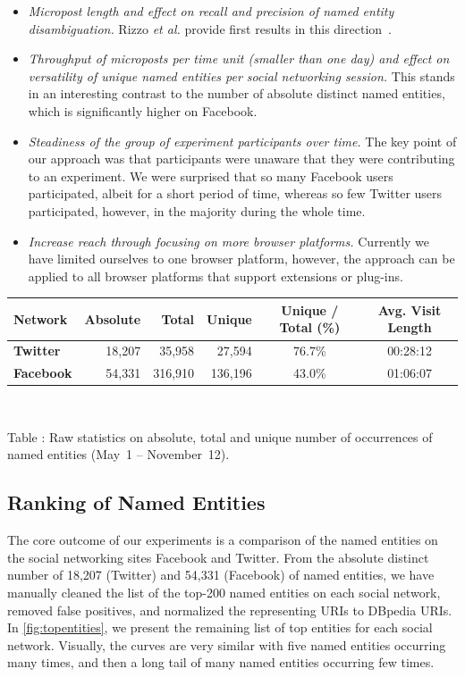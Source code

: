 \documentclass{iosart2c}
\begin{document}
\begin{itemize}
\item \emph{Micropost length and effect on recall and precision of named entity disambiguation.}
Rizzo \textit{et al.} provide first results in this direction~\cite{nerd}.
\item \emph{Throughput of microposts per time unit (smaller than one day) and effect on versatility of unique named entities per social networking session.}
This stands in an interesting contrast to the number of absolute distinct named entities, which is significantly higher on Facebook.
\item \emph{Steadiness of the group of experiment participants over time.}
The key point of our approach was that participants were unaware that they were contributing to an experiment.
We were surprised that so many Facebook users participated, albeit for a short period of time, whereas so few Twitter users participated, however, in the majority during the whole time.
\item \emph{Increase reach through focusing on more browser platforms.}
Currently we have limited ourselves to one browser platform, however, the approach can be applied to all browser platforms that support extensions or plug-ins.
\end{itemize}

\begin{table}
  \centering
    \begin{tabular}{|l | r | r | r | c | c |}
    \hline
    \textbf{Network} &
	\textbf{Absolute} & \textbf{Total} & \textbf{Unique} & \textbf{Unique / Total (\%)} & \textbf{Avg. Visit Length} \\ \hline
	\textbf{Twitter} &
	18,207 & 35,958 & 27,594 & 76.7\% & 00:28:12 \\
    \hline
    \textbf{Facebook} &
	54,331 & 316,910 	& 136,196 & 43.0\% & 01:06:07 \\ 
    \hline
  \end{tabular}
  \label{tab:raw}
  \\[1em]
  \addtocounter{table}{1}
  Table : Raw statistics on absolute, total and unique number of occurrences of named entities (May~1 -- November~12).
\end{table}

\subsection{Ranking of Named Entities}
The core outcome of our experiments is a comparison of the named entities on the social networking sites Facebook and Twitter.
From the absolute distinct number of 18,207 (Twitter) and 54,331 (Facebook) of named entities, we have manually cleaned the list of the top-200 named entities on each social network, removed false positives, and normalized the representing URIs to DBpedia URIs.
In \autoref{fig:topentities}, we present the remaining list of top entities for each social network.
Visually, the curves are very similar with five named entities occurring many times, and then a long tail of many named entities occurring few times.
\end{document}
